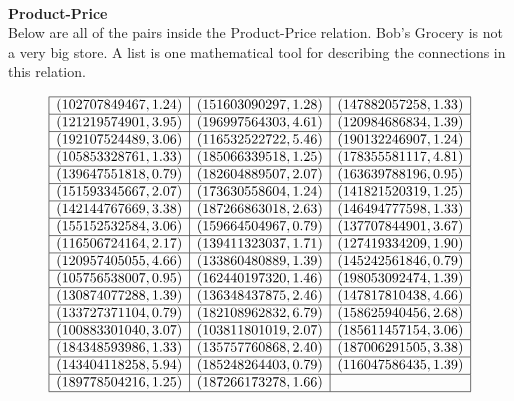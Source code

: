 \documentclass{ximera}
\begin{document}
\quad \\

\textbf{Product-Price} \\
Below are all of the pairs inside the Product-Price relation.  Bob's Grocery is not a very big store. A list is one mathematical tool for describing the connections in this relation.

\[
\begin{array}{|l|l|l|}
\hline
(102707849467, 1.24) & (151603090297, 1.28) & (147882057258, 1.33) \\\hline
(121219574901, 3.95) & (196997564303, 4.61) & (120984686834, 1.39) \\\hline
(192107524489, 3.06) & (116532522722, 5.46) & (190132246907, 1.24) \\\hline
(105853328761, 1.33) & (185066339518, 1.25) & (178355581117, 4.81) \\\hline 
(139647551818, 0.79) & (182604889507, 2.07) & (163639788196, 0.95) \\\hline 
(151593345667, 2.07) & (173630558604, 1.24) & (141821520319, 1.25) \\\hline 
(142144767669, 3.38) & (187266863018, 2.63) & (146494777598, 1.33) \\\hline 
(155152532584, 3.06) & (159664504967, 0.79) & (137707844901, 3.67) \\\hline 
(116506724164, 2.17) & (139411323037, 1.71) & (127419334209, 1.90) \\\hline 
(120957405055, 4.66) & (133860480889, 1.39) & (145242561846, 0.79) \\\hline 
(105756538007, 0.95) & (162440197320, 1.46) & (198053092474, 1.39) \\\hline 
(130874077288, 1.39) & (136348437875, 2.46) & (147817810438, 4.66) \\\hline 
(133727371104, 0.79) & (182108962832, 6.79) & (158625940456, 2.68) \\\hline 
(100883301040, 3.07) & (103811801019, 2.07) & (185611457154, 3.06) \\\hline 
(184348593986, 1.33) & (135757760868, 2.40) & (187006291505, 3.38) \\\hline 
(143404118258, 5.94) & (185248264403, 0.79) & (116047586435, 1.39) \\\hline 
(189778504216, 1.25) & (187266173278, 1.66) &    \\\hline
\end{array}
\]
\end{document}
